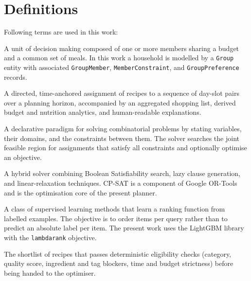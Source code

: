 %
%
\chapter{Definitions}

Following terms are used in this work:\par\bigskip

\begin{description}[style=multiline, labelwidth=5cm, leftmargin=5.5cm]

  \item[Household]
       A unit of decision making composed of one or more members sharing a budget and a common set of meals. In this work a household is modelled by a \texttt{Group} entity with associated \texttt{GroupMember}, \texttt{MemberConstraint}, and \texttt{GroupPreference} records.

  \item[Meal Plan]
       A directed, time-anchored assignment of recipes to a sequence of day-slot pairs over a planning horizon, accompanied by an aggregated shopping list, derived budget and nutrition analytics, and human-readable explanations.

  \item[Constraint Programming]
       A declarative paradigm for solving combinatorial problems by stating variables, their domains, and the constraints between them. The solver searches the joint feasible region for assignments that satisfy all constraints and optionally optimise an objective.

  \item[CP-SAT]
       A hybrid solver combining Boolean Satisfiability search, lazy clause generation, and linear-relaxation techniques. CP-SAT is a component of Google OR-Tools and is the optimisation core of the present planner.

  \item[Learning-to-Rank]
       A class of supervised learning methods that learn a ranking function from labelled examples. The objective is to order items per query rather than to predict an absolute label per item. The present work uses the LightGBM library with the \texttt{lambdarank} objective.

  \item[Candidate Pool]
       The shortlist of recipes that passes deterministic eligibility checks (category, quality score, ingredient and tag blockers, time and budget strictness) before being handed to the optimiser.


\end{description}
